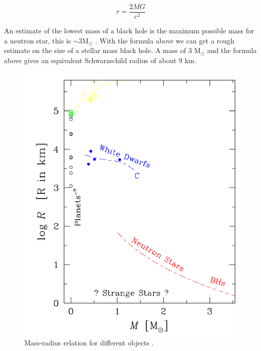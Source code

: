 %

\begin{equation}
                r = \frac{2 M G}{c^2}
\end{equation}

An estimate of the lowest mass of a black hole is the maximum possible mass for a neutron star, this is $\sim 3 \text{M}_\odot$ \citep{rhoades_maximum_1974}. With the formula above we can get a rough estimate on the size of a stellar mass black hole. A mass of 3 M$_\odot$ and the formula above gives an equivalent Schwarzschild radius of about 9 km. 


\begin{figure}
                \centering
                \includegraphics[scale=0.3]{assets/images/mass-radius.png}
                \caption{Mass-radius relation for different objects \citep{de2008stars}.}
                \label{fig:massrad}
\end{figure}

